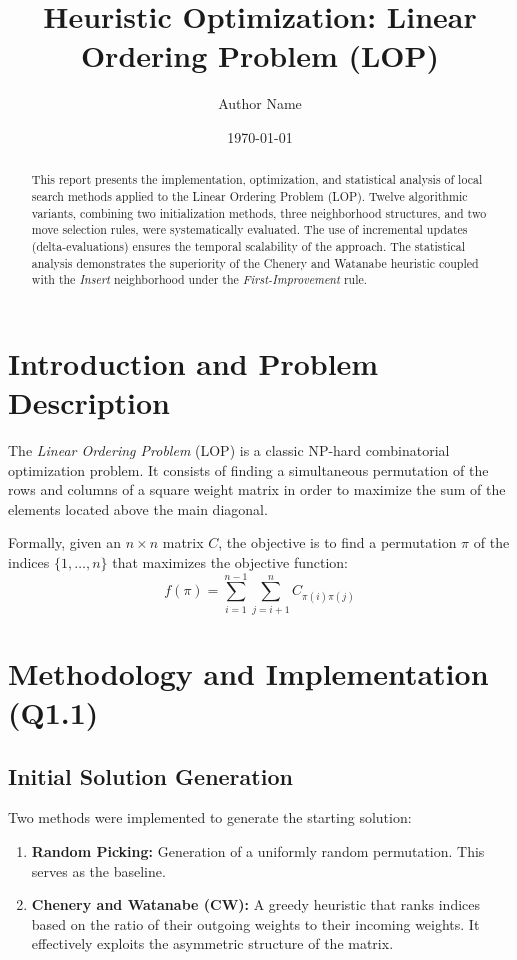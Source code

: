 \documentclass[11pt, a4paper]{article}
\title{\textbf{Heuristic Optimization: Linear Ordering Problem (LOP)}}
\author{Author Name}
\date{\today}
\begin{document}
\maketitle

\begin{abstract}
This report presents the implementation, optimization, and statistical analysis of local search methods applied to the Linear Ordering Problem (LOP). Twelve algorithmic variants, combining two initialization methods, three neighborhood structures, and two move selection rules, were systematically evaluated. The use of incremental updates (delta-evaluations) ensures the temporal scalability of the approach. The statistical analysis demonstrates the superiority of the Chenery and Watanabe heuristic coupled with the \textit{Insert} neighborhood under the \textit{First-Improvement} rule.
\end{abstract}

\section{Introduction and Problem Description}
The \textit{Linear Ordering Problem} (LOP) is a classic NP-hard combinatorial optimization problem. It consists of finding a simultaneous permutation of the rows and columns of a square weight matrix in order to maximize the sum of the elements located above the main diagonal.

Formally, given an $n \times n$ matrix $C$, the objective is to find a permutation $\pi$ of the indices $\{1, \dots, n\}$ that maximizes the objective function:
\begin{equation}
f(\pi) = \sum_{i=1}^{n-1} \sum_{j=i+1}^{n} C_{\pi(i)\pi(j)}
\end{equation}

\section{Methodology and Implementation (Q1.1)}

\subsection{Initial Solution Generation}
Two methods were implemented to generate the starting solution:
\begin{enumerate}
    \item \textbf{Random Picking:} Generation of a uniformly random permutation. This serves as the baseline.
    \item \textbf{Chenery and Watanabe (CW):} A greedy heuristic that ranks indices based on the ratio of their outgoing weights to their incoming weights. It effectively exploits the asymmetric structure of the matrix.
\end{enumerate}
\end{document}
